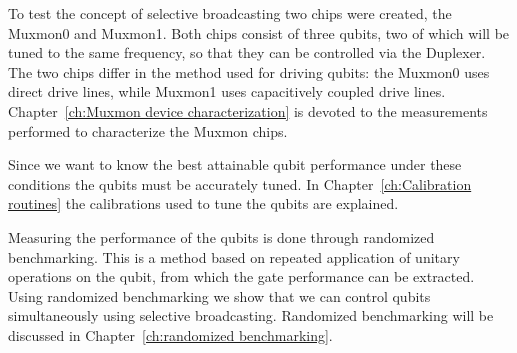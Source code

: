 \documentclass[12pt]{report}
\begin{document}
  To test the concept of selective broadcasting two chips were created, the Muxmon0 and Muxmon1. Both chips consist of three qubits, two of which will be tuned to the same frequency, so that they can be controlled via the Duplexer. The two chips differ in the method used for driving qubits: the Muxmon0 uses direct drive lines, while Muxmon1 uses capacitively coupled drive lines. Chapter~\ref{ch:Muxmon device characterization} is devoted to the measurements performed to characterize the Muxmon chips.

  Since we want to know the best attainable qubit performance under these conditions the qubits must be accurately tuned. In Chapter~\ref{ch:Calibration routines} the calibrations used to tune the qubits are explained.

  Measuring the performance of the qubits is done through randomized benchmarking. This is a method based on repeated application of unitary operations on the qubit, from which the gate performance can be extracted. Using randomized benchmarking we show that we can control qubits simultaneously using selective broadcasting. Randomized benchmarking will be discussed in Chapter~\ref{ch:randomized benchmarking}.







\begin{appendices}



\end{appendices}



\end{document}
